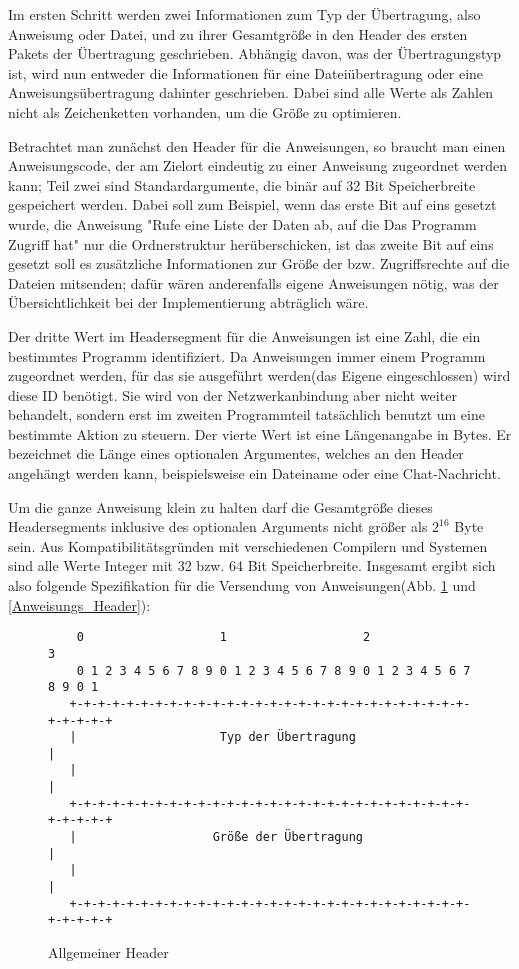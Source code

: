 Im ersten Schritt werden zwei Informationen zum Typ der Übertragung, also Anweisung oder Datei, und zu ihrer Gesamtgröße in den Header des ersten Pakets der Übertragung geschrieben.
Abhängig davon, was der Übertragungstyp ist, wird nun entweder die Informationen für eine Dateiübertragung oder eine Anweisungsübertragung dahinter geschrieben.
Dabei sind alle Werte als Zahlen nicht als Zeichenketten vorhanden, um die Größe zu optimieren.\par 
Betrachtet man zunächst den Header für die Anweisungen, so braucht man einen Anweisungscode, der am Zielort eindeutig zu einer Anweisung zugeordnet werden kann; Teil zwei sind Standardargumente, die binär auf 32 Bit Speicherbreite gespeichert werden.
Dabei soll zum Beispiel, wenn das erste Bit auf eins gesetzt wurde, die Anweisung "Rufe eine Liste der Daten ab, auf die Das Programm Zugriff hat" nur die Ordnerstruktur herüberschicken, ist das zweite Bit auf eins gesetzt soll es zusätzliche Informationen zur Größe der bzw. Zugriffsrechte auf die Dateien mitsenden; dafür wären anderenfalls eigene Anweisungen nötig, was der Übersichtlichkeit bei der Implementierung abträglich wäre.\par 
Der dritte Wert im Headersegment für die Anweisungen ist eine Zahl, die ein bestimmtes Programm identifiziert.
Da Anweisungen immer einem Programm zugeordnet werden, für das sie ausgeführt werden(das Eigene eingeschlossen) wird diese ID benötigt.
Sie wird von der Netzwerkanbindung aber nicht weiter behandelt, sondern erst im zweiten Programmteil tatsächlich benutzt um eine bestimmte Aktion zu steuern.
Der vierte Wert ist eine Längenangabe in Bytes.
Er bezeichnet die Länge eines optionalen Argumentes, welches an den Header angehängt werden kann, beispielsweise ein Dateiname oder eine Chat-Nachricht.\par 
Um die ganze Anweisung klein zu halten darf die Gesamtgröße dieses Headersegments inklusive des optionalen Arguments nicht größer als $2^{16}$ Byte sein.
Aus Kompatibilitätsgründen mit verschiedenen Compilern und Systemen sind alle Werte Integer mit 32 bzw. 64 Bit Speicherbreite.
Insgesamt ergibt sich also folgende Spezifikation für die Versendung von Anweisungen(Abb. \ref{Allgem_Header} und \ref{Anweisungs_Header}):\par

\begin{figure}[h]
\begin{lstlisting}
	0                   1                   2                   3   
    0 1 2 3 4 5 6 7 8 9 0 1 2 3 4 5 6 7 8 9 0 1 2 3 4 5 6 7 8 9 0 1 
   +-+-+-+-+-+-+-+-+-+-+-+-+-+-+-+-+-+-+-+-+-+-+-+-+-+-+-+-+-+-+-+-+
   |                    Typ der Übertragung                        |
   |                                                               |
   +-+-+-+-+-+-+-+-+-+-+-+-+-+-+-+-+-+-+-+-+-+-+-+-+-+-+-+-+-+-+-+-+
   |                   Größe der Übertragung                       |
   |                                                               |
   +-+-+-+-+-+-+-+-+-+-+-+-+-+-+-+-+-+-+-+-+-+-+-+-+-+-+-+-+-+-+-+-+
\end{lstlisting}
\caption{Allgemeiner Header}
\label{Allgem_Header}
\end{figure}

